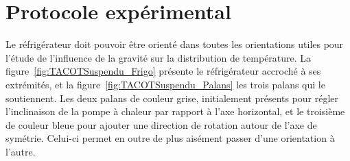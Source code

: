 \section{Protocole expérimental}
Le réfrigérateur doit pouvoir être orienté dans toutes les orientations utiles pour l'étude de l'influence de la gravité sur la distribution de température. La figure~\ref{fig:TACOTSuspendu_Frigo} présente le réfrigérateur accroché à ses extrémités, et la figure~\ref{fig:TACOTSuspendu_Palans} les trois palans qui le soutiennent. Les deux palans de couleur grise, initialement présents pour régler l'inclinaison de la pompe à chaleur par rapport à l'axe horizontal, et le troisième de couleur bleue pour ajouter une direction de rotation autour de l'axe de symétrie. Celui-ci permet en outre de plus aisément passer d'une orientation à l'autre. 

